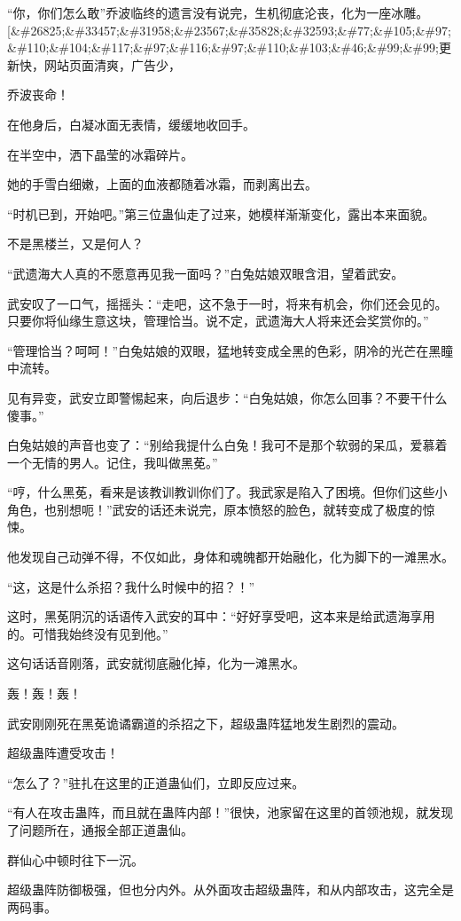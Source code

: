 \begin{this_body}
“你，你们怎么敢”乔波临终的遗言没有说完，生机彻底沦丧，化为一座冰雕。[\&\#26825;\&\#33457;\&\#31958;\&\#23567;\&\#35828;\&\#32593;\&\#77;\&\#105;\&\#97;\&\#110;\&\#104;\&\#117;\&\#97;\&\#116;\&\#97;\&\#110;\&\#103;\&\#46;\&\#99;\&\#99;更新快，网站页面清爽，广告少，

乔波丧命！

在他身后，白凝冰面无表情，缓缓地收回手。

在半空中，洒下晶莹的冰霜碎片。

她的手雪白细嫩，上面的血液都随着冰霜，而剥离出去。

“时机已到，开始吧。”第三位蛊仙走了过来，她模样渐渐变化，露出本来面貌。

不是黑楼兰，又是何人？

“武遗海大人真的不愿意再见我一面吗？”白兔姑娘双眼含泪，望着武安。

武安叹了一口气，摇摇头：“走吧，这不急于一时，将来有机会，你们还会见的。只要你将仙缘生意这块，管理恰当。说不定，武遗海大人将来还会奖赏你的。”

“管理恰当？呵呵！”白兔姑娘的双眼，猛地转变成全黑的色彩，阴冷的光芒在黑瞳中流转。

见有异变，武安立即警惕起来，向后退步：“白兔姑娘，你怎么回事？不要干什么傻事。”

白兔姑娘的声音也变了：“别给我提什么白兔！我可不是那个软弱的呆瓜，爱慕着一个无情的男人。记住，我叫做黑莬。”

“哼，什么黑莬，看来是该教训教训你们了。我武家是陷入了困境。但你们这些小角色，也别想呃！”武安的话还未说完，原本愤怒的脸色，就转变成了极度的惊悚。

他发现自己动弹不得，不仅如此，身体和魂魄都开始融化，化为脚下的一滩黑水。

“这，这是什么杀招？我什么时候中的招？！”

这时，黑莬阴沉的话语传入武安的耳中：“好好享受吧，这本来是给武遗海享用的。可惜我始终没有见到他。”

这句话话音刚落，武安就彻底融化掉，化为一滩黑水。

轰！轰！轰！

武安刚刚死在黑莬诡谲霸道的杀招之下，超级蛊阵猛地发生剧烈的震动。

超级蛊阵遭受攻击！

“怎么了？”驻扎在这里的正道蛊仙们，立即反应过来。

“有人在攻击蛊阵，而且就在蛊阵内部！”很快，池家留在这里的首领池规，就发现了问题所在，通报全部正道蛊仙。

群仙心中顿时往下一沉。

超级蛊阵防御极强，但也分内外。从外面攻击超级蛊阵，和从内部攻击，这完全是两码事。


\end{this_body}
